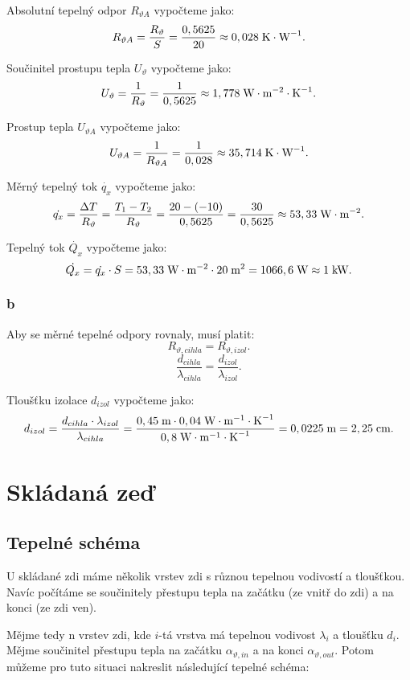 \documentclass{article}
\begin{document}
Absolutní tepelný odpor $R_{\vartheta A}$ vypočteme jako:
$$
    R_{\vartheta A} = \frac{R_{\vartheta}}{S} = \frac{0,5625}{20} \approx 0,028 \; \textrm{K} \cdot \textrm{W}^{-1}.
$$

Součinitel prostupu tepla $U_\vartheta$ vypočteme jako:
$$
    U_\vartheta = \frac{1}{R_{\vartheta}} = \frac{1}{0,5625} \approx 1,778 \; \textrm{W} \cdot \textrm{m}^{-2} \cdot \textrm{K}^{-1}.
$$

Prostup tepla $U_{\vartheta A}$ vypočteme jako:
$$
    U_{\vartheta A} = \frac{1}{R_{\vartheta A}} = \frac{1}{0,028} \approx 35,714 \; \textrm{K} \cdot \textrm{W}^{-1}.
$$

Měrný tepelný tok $\dot{q_x}$ vypočteme jako:
$$
    \dot{q_x} = \frac{\Delta T}{R_{\vartheta}} = \frac{T_1 - T_2}{R_{\vartheta}} = \frac{20 - (-10)}{0,5625} = \frac{30}{0,5625} \approx 53,33 \; \textrm{W} \cdot \textrm{m}^{-2}.
$$

Tepelný tok $\dot{Q_x}$ vypočteme jako:
$$
    \dot{Q_x} = \dot{q_x} \cdot S = 53,33 \; \textrm{W} \cdot \textrm{m}^{-2} \cdot 20 \; \textrm{m}^{\textrm{2}} = 1066,6 \; \textrm{W} \approx 1 \; \textrm{kW}.
$$

\subsubsection{b}
Aby se měrné tepelné odpory rovnaly, musí platit:
$$
    R_{\vartheta,cihla} = R_{\vartheta,izol}.
$$
$$
    \frac{d_{cihla}}{\lambda_{cihla}} = \frac{d_{izol}}{\lambda_{izol}}.
$$

Tloušťku izolace $d_{izol}$ vypočteme jako:
$$
    d_{izol} = \frac{d_{cihla} \cdot \lambda_{izol}}{\lambda_{cihla}} = \frac{0,45 \; \textrm{m} \cdot 0,04 \; \textrm{W} \cdot \textrm{m}^{-1} \cdot \textrm{K}^{-1}}{0,8 \; \textrm{W} \cdot \textrm{m}^{-1} \cdot \textrm{K}^{-1}} = 0,0225 \; \textrm{m} = 2,25 \; \textrm{cm}.
$$

\newpage



\section{ Skládaná zeď \spicy \spicy}


\subsection{Tepelné schéma}
U skládané zdi máme několik vrstev zdi s různou tepelnou vodivostí a tloušťkou. Navíc počítáme se součinitely přestupu tepla na začátku (ze vnitř do zdi) a na konci (ze zdi ven).

Mějme tedy n vrstev zdi, kde $i$-tá vrstva má tepelnou vodivost $\lambda_i$ a tloušťku $d_i$. Mějme součinitel přestupu tepla na začátku $\alpha_{\vartheta,in}$ a na konci $\alpha_{\vartheta,out}$. Potom můžeme pro tuto situaci nakreslit následující tepelné schéma:
\end{document}

